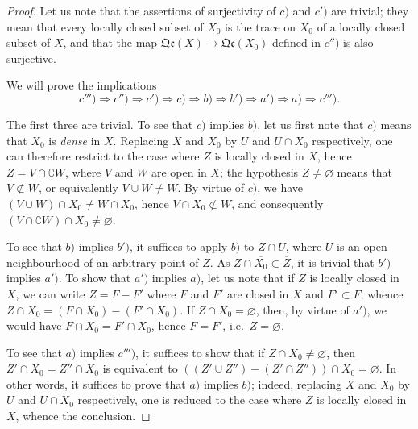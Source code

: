 \begin{proof}
Let us note that the assertions of surjectivity of $c)$ and $c')$ are trivial; they mean that every locally closed subset of $X_0$ is the trace on $X_0$ of a locally closed subset of $X$, and that the map $\mathfrak{Qc}(X)\to\mathfrak{Qc}(X_0)$ defined in $c'')$ is also surjective.

We will prove the implications
\[
  c''')\Rightarrow c'')\Rightarrow c')\Rightarrow c)\Rightarrow b)\Rightarrow b')\Rightarrow a')\Rightarrow a)\Rightarrow c''').
\]

The first three are trivial.
To see that $c)$ implies $b)$, let us first note that $c)$ means that $X_0$ is \emph{dense} in $X$.
Replacing $X$ and $X_0$ by $U$ and $U\cap X_0$ respectively, one can therefore restrict to the case where $Z$ is locally closed in $X$, hence $Z=V\cap\complement W$, where $V$ and $W$ are open in $X$; the hypothesis $Z\neq\varnothing$ means that $V\not\subset W$, or equivalently $V\cup W\neq W$.
By virtue of $c)$, we have $(V\cup W)\cap X_0\neq W\cap X_0$, hence $V\cap X_0\not\subset W$, and consequently $(V\cap\complement W)\cap X_0\neq\varnothing$.

To see that $b)$ implies $b')$, it suffices to apply $b)$ to $Z\cap U$, where $U$ is an open neighbourhood of an arbitrary point of $Z$.
As $Z\cap\overline{X_0}\subset\overline{Z}$, it is trivial that $b')$ implies $a')$.
To show that $a')$ implies $a)$, let us note that if $Z$ is locally closed in $X$, we can write $Z=F-F'$ where $F$ and $F'$ are closed in $X$ and $F'\subset F$; whence $Z\cap X_0=(F\cap X_0)-(F'\cap X_0)$.
If $Z\cap X_0=\varnothing$, then, by virtue of $a')$, we would have $F\cap X_0=F'\cap X_0$, hence $F=F'$, i.e.\ $Z=\varnothing$.

To see that $a)$ implies $c''')$, it suffices to show that if $Z\cap X_0\neq\varnothing$, then $Z'\cap X_0=Z''\cap X_0$ is equivalent to $((Z'\cup Z'')-(Z'\cap Z''))\cap X_0=\varnothing$.
In other words, it suffices to prove that $a)$ implies $b)$; indeed, replacing $X$ and $X_0$ by $U$ and $U\cap X_0$ respectively, one is reduced to the case where $Z$ is locally closed in $X$, whence the conclusion.


\end{proof}
